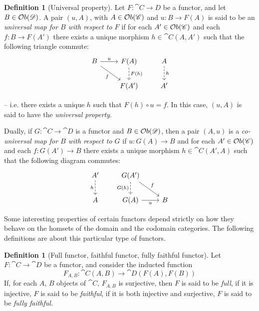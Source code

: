 \documentclass[a4paper, twoside,openright]{report}
\theoremstyle{plain}
\theoremstyle{definition}
\newtheorem{definition}[theorem]{Definition}
\begin{document}
\begin{definition}[Universal property]\label{def:univ_prop}
    Let $F: \cat{C \rightarrow D}$ be a functor, and let $B \in \mathcal{O}b(\mathscr{D})$. A pair $(u, A)$, with $A \in \mathcal{O}b(\mathscr{C})$ and $u: B \rightarrow F(A)$ is said to be an \emph{universal map for $B$ with respect to $F$} if for each $A' \in \mathcal{O}b(\mathscr{C})$ and each $f: B \rightarrow F(A')$ there exists a unique morphism $h \in \cat C(A, A')$ such that the following triangle commute:
    \[
        \begin{tikzcd}
            B \arrow[r, "u"] \arrow[dr, "f" swap] & F(A) \arrow[d, dashed, "F(h)"] & A \arrow[d, dashed, "h"]\\
            & F(A') & A'
        \end{tikzcd}
    \]

    -- i.e. there exists a unique $h$ such that $F(h) \circ u = f$. In this case, $(u, A)$ is said to have the \emph{universal property}.

    Dually, if $G: \cat C \rightarrow \cat D$ is a functor and $B \in \mathcal{O}b(\mathscr{D})$, then a pair $(A, u)$ is a \emph{co-universal map for $B$ with respect to $G$} if $u:G(A) \rightarrow B$ and for each $A' \in \mathcal{O}b(\mathscr{C})$ and each $f: G(A') \rightarrow B$ there exists a unique morphism $h \in \cat{C}(A', A)$ such that the following diagram commutes:
    \[
        \begin{tikzcd}
            A' \arrow[d, dashed, "h" swap] & G(A') \arrow[d, dashed, "G(h)" swap] \arrow[dr, "f"] \\
            A & G(A) \arrow[r, "u" swap] & B
        \end{tikzcd}
    \]
\end{definition}

Some interesting properties of certain functors depend strictly on how they behave on the homsets of the domain and the codomain categories. The following definitions are about this particular type of functors.

\begin{definition}[Full functor, faithful functor, fully faithful functor]
    Let $F: \cat C \rightarrow \cat D$ be a functor, and consider the inducted function
    $$
        F_{A, B} : {\cat C}(A, B) \rightarrow {\cat D}(F(A), F(B))
    $$
    If, for each $A$, $B$ objects of $\cat C$, $F_{A, B}$ is surjective, then $F$ is said to be \emph{full}, if it is injective, $F$ is said to be \emph{faithful}, if it is both injective and surjective, $F$ is said to be \emph{fully faithful}.
\end{definition}
\end{document}
